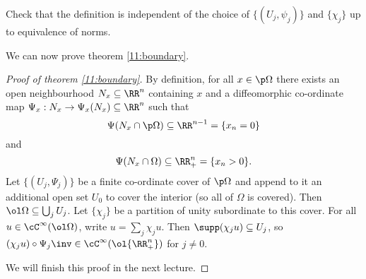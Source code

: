 \begin{exer}
  Check that the definition is independent of the choice of $\{(U_j,\psi_j)\}$ and $\{\chi_j\}$ up to equivalence of norms.
\end{exer}

We can now prove theorem \ref{11:boundary}.


\begin{proof}[Proof of theorem \ref{11:boundary}]
  By definition, for all $x\in\p\Omega$ there exists an open neighbourhood $N_x\subseteq\RR^n$ containing $x$ and a diffeomorphic co-ordinate map $\Psi_x: N_x \to \Psi_x(N_x)\subseteq\RR^n$ such that
  \[ \Psi(N_x\cap\p\Omega)\subseteq\RR^{n-1}=\{x_n=0\} \]
  and 
  \[ \Psi(N_x\cap\Omega)\subseteq\RR_+^n=\{x_n>0\}. \]
  Let $\{(U_j,\Psi_j)\}$ be a finite co-ordinate cover of $\p\Omega$ and append to it an additional open set $U_0$ to cover the interior (so all of $\Omega$ is covered).
  Then $\ol\Omega \subseteq \bigcup_j U_j$.
  Let $\{\chi_j\}$ be a partition of unity subordinate to this cover.
  For all $u\in\cC^\infty(\ol\Omega)$, write $u=\sum_j\chi_ju$.
  Then $\supp(\chi_ju)\subseteq U_j$, so $(\chi_ju)\circ\Psi_j\inv\in\cC^\infty(\ol{\RR_+^n})$ for $j\neq0$.

  We will finish this proof in the next lecture.
\end{proof}
